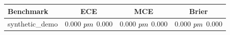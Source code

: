 \begin{tabular}{lccc}
\toprule
Benchmark & ECE & MCE & Brier \\
\midrule
synthetic_demo & 0.000 $\\pm$ 0.000 & 0.000 $\\pm$ 0.000 & 0.000 $\\pm$ 0.000 \\
\bottomrule
\end{tabular}

